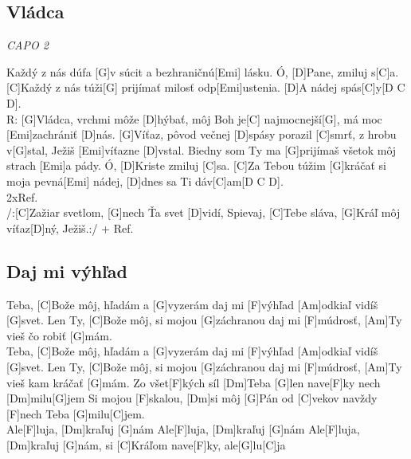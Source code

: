 \documentclass[10pt]{article}
\begin{document}
\begin{Large}
\begin{minipage}{\textwidth}
\subsection{Vládca}
\textit{CAPO 2}
\begin{multicols*}{2}
\begin{guitar}	
	[C]Každý z nás dúfa [G]v súcit 
	a bezhraničnú[Emi] lásku.
	Ó, [D]Pane, zmiluj s[C]a.
	[C]Každý z nás túži[G] prijímať 
	milosť odp[Emi]ustenia.
	[D]A nádej spás[C]y[D C D].
	\\
	R: [G]Vládca, vrchmi môže [D]hýbať,
	môj Boh je[C] najmocnejší[G], 
	má moc [Emi]zachrániť [D]nás.
	[G]Víťaz, pôvod večnej [D]spásy
	porazil [C]smrť, z hrobu v[G]stal,
	Ježiš [Emi]víťazne [D]vstal.
	\columnbreak
	[C]Biedny som Ty ma [G]prijímaš 
	všetok môj strach [Emi]a pády.
	Ó, [D]Kriste zmiluj [C]sa.
	[C]Za Tebou túžim [G]kráčať 
	si moja pevná[Emi] nádej,
	[D]dnes sa Ti dáv[C]am[D C D].
	\\
	2xRef.
	\\
	/:[C]Zažiar svetlom, 
	[G]nech Ťa svet [D]vidí, Spievaj, 
	[C]Tebe sláva, 
	[G]Kráľ môj víťaz[D]ný, Ježiš.:/ + Ref.
\end{guitar}
\end{multicols*}
\end{minipage}

\begin{minipage}{\textwidth}
\subsection{Daj mi výhľad}
\begin{multicols*}{2}
\begin{guitar}	
	Teba, [C]Bože môj, hľadám a [G]vyzerám
	daj mi [F]výhľad [Am]odkiaľ vidíš [G]svet.
	Len Ty, [C]Bože môj, si mojou [G]záchranou
	daj mi [F]múdrosť, [Am]Ty vieš čo robiť [G]mám.
	\\
	Teba, [C]Bože môj, hľadám a [G]vyzerám
	daj mi [F]výhľad [Am]odkiaľ vidíš [G]svet.
	Len Ty, [C]Bože môj, si mojou [G]záchranou
	daj mi [F]múdrosť, [Am]Ty vieš kam kráčať [G]mám.
	\columnbreak
	Zo všet[F]kých síl [Dm]Teba [G]len
	nave[F]ky nech [Dm]milu[G]jem
	Si mojou [F]skalou, [Dm]si môj [G]Pán
	od [C]vekov navždy [F]nech Teba [G]milu[C]jem.
	\\
	Ale[F]luja, [Dm]kraľuj [G]nám
	Ale[F]luja, [Dm]kraľuj [G]nám
	Ale[F]luja, [Dm]kraľuj [G]nám,
	si [C]Kráľom nave[F]ky, ale[G]lu[C]ja
\end{guitar}
\end{multicols*}
\end{minipage}


\end{Large}
\end{document}
